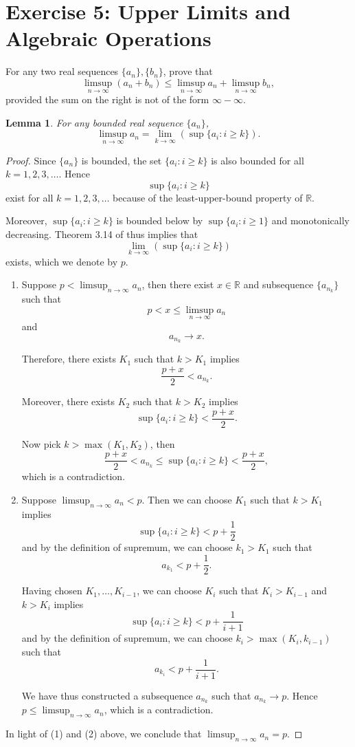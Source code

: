 \documentclass{amsbook}
\newtheorem{lemma}[theorem]{Lemma}
\theoremstyle{definition}
\theoremstyle{remark}
\numberwithin{section}{chapter}
\numberwithin{equation}{chapter}
\begin{document}
\section{Exercise 5: Upper Limits and Algebraic Operations}\label{Exercise 3.5}
For any two real sequences $\{a_n\},\{b_n\}$, prove that\[
\limsup_{n\to\infty}(a_n+b_n)\leqslant\limsup_{n\to\infty}a_n+\limsup_{n\to\infty}b_n,
\]provided the sum on the right is not of the form $\infty-\infty$.
\begin{lemma}\label{lemma3.5}
For any bounded real sequence $\{a_n\}$,\[
\limsup_{n\to\infty}a_n=\lim_{k\to\infty}\left(\sup\{a_i:i\geqslant k\}\right).
\]
\end{lemma}
\begin{proof}
Since $\{a_n\}$ is bounded, the set $\{a_i:i\geqslant k\}$ is also bounded for all $k=1,2,3,\dots$. Hence \[
\sup\{a_i:i\geqslant k\}
\]exist for all $k=1,2,3,\dots$ because of the least-upper-bound property of $\mathbb{R}$.

Moreover, $\sup\{a_i:i\geqslant k\}$ is bounded below by $\sup\{a_i:i\geqslant 1\}$ and monotonically decreasing. Theorem 3.14 of \cite{rudin1976principles} thus implies that\[
\lim_{k\to\infty}\left(\sup\{a_i:i\geqslant k\}\right)
\]exists, which we denote by $p$.

\begin{enumerate}
\item Suppose $p<\limsup_{n\to\infty} a_n$, then there exist $x\in\mathbb{R}$ and subsequence $\{a_{n_k}\}$ such that\[
p<x\leqslant\limsup_{n\to\infty} a_n
\]and\[
a_{n_k}\to x.
\]

Therefore, there exists $K_1$ such that $k>K_1$ implies\[
\frac{p+x}{2}<a_{n_k}.
\]

Moreover, there exists $K_2$ such that $k>K_2$ implies\[
\sup\{a_i:i\geqslant k\} < \frac{p+x}{2}.
\]

Now pick $k>\max(K_1,K_2)$, then\[
\frac{p+x}{2}<a_{n_k}\leqslant\sup\{a_i:i\geqslant k\} < \frac{p+x}{2},
\]which is a contradiction.
\item Suppose $\limsup_{n\to\infty} a_n<p$. Then we can choose $K_1$ such that $k>K_1$ implies\[
\sup\{a_i:i\geqslant k\}<p+\frac{1}{2}
\] and by the definition of supremum, we can choose $k_1>K_1$ such that\[
a_{k_1}<p+\frac{1}{2}.
\]

Having chosen $K_1,\dots,K_{i-1}$, we can choose $K_i$ such that $K_i>K_{i-1}$ and $k>K_i$ implies\[
\sup\{a_i:i\geqslant k\}<p+\frac{1}{i+1}
\] and by the definition of supremum, we can choose $k_i>\max(K_i,k_{i-1})$ such that\[
a_{k_i}<p+\frac{1}{i+1}.
\]

We have thus constructed a subsequence $a_{n_k}$ such that $a_{n_k}\to p$. Hence $p\leqslant \limsup_{n\to\infty} a_n$, which is a contradiction.
\end{enumerate}

In light of (1) and (2) above, we conclude that $\limsup_{n\to\infty}a_n=p$.
\end{proof}
\end{document}
